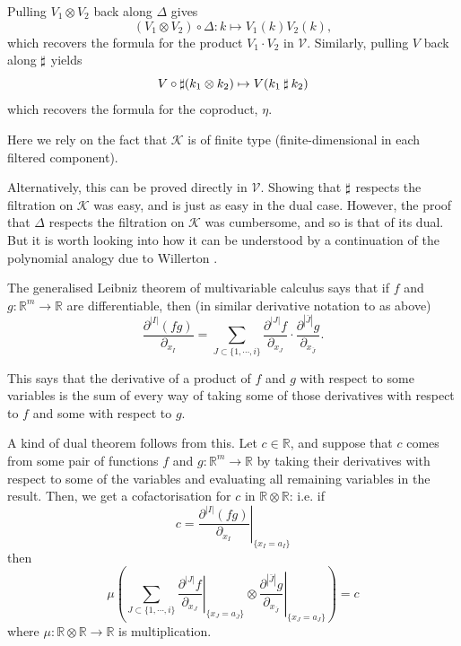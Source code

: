 Pulling \(V_{1} \otimes V_{2}\) back along \(\Delta\) gives
\[(V_{1} \otimes V_{2}) \circ \Delta: k \mapsto V_{1}(k)V_{2}(k),\]
which recovers the formula for the product \(V_{1} \cdot V_{2}\) in \(\mathcal{V}\). Similarly, pulling \(V\) back along \(\mathbin{\sharp}\) yields
\[V \circ \mathbin{\sharp} (k_{1} \otimes k_{2}) \mapsto V(k_{1} \mathbin{\sharp} k_{2})\]
which recovers the formula for the coproduct, \(\eta\).

Here we rely on the fact that \(\mathcal{K}\) is of finite type (finite-dimensional in each filtered component).

\begin{remark}
	Alternatively, this can be proved directly in \(\mathcal{V}\). Showing that \(\mathbin{\sharp}\) respects the filtration on \(\mathcal{K}\) was easy, and is just as easy in the dual case. However, the proof that \(\Delta\) respects the filtration on \(\mathcal{K}\) was cumbersome, and so is that of its dual. But it is worth looking into how it can be understood by a continuation of the polynomial analogy due to Willerton \cite{vassiliev-invariants-and-the-hopf-algebra-of-chord-diagrams}.

	The generalised Leibniz theorem of multivariable calculus says that if \(f\) and \(g: \mathbb{R}^{m} \to \mathbb{R}\) are differentiable, then (in similar derivative notation to as above)
	\[
		\frac{\partial^{|I|}(fg)}{\partial_{x_{I}}}
		=
		\sum_{J \subset \{1, \cdots, i\}}
		\frac{\partial^{|J|} f}{\partial_{x_{J}}}
		\cdot
		\frac{\partial^{|\bar{J}|} g}{\partial_{x_{\bar{J}}}}.
	\]

	This says that the derivative of a product of \(f\) and \(g\) with respect to some variables is the sum of every way of taking some of those derivatives with respect to \(f\) and some with respect to \(g\).

	A kind of dual theorem follows from this. Let \(c \in \mathbb{R}\), and suppose that \(c\) comes from some pair of functions \(f\) and \(g: \mathbb{R}^{m} \to \mathbb{R}\) by taking their derivatives with respect to some of the variables and evaluating all remaining variables in the result. Then, we get a cofactorisation for \(c\) in \(\mathbb{R} \otimes \mathbb{R}\): i.e. if
	\[c = \left. \frac{\partial^{|I|}(fg)}{\partial_{x_{I}}} \right|_{\{x_{I} = a_{I}\}}\]
	then
	\[
		\mu
		\left(
		\sum_{J \subset \{1, \cdots, i\}}
		\left. \frac{\partial^{|J|} f}{\partial_{x_{J}}} \right|_{\{x_{J} = a_{\bar{J}}\}}
		\otimes
		\left. \frac{\partial^{|\bar{J}|} g}{\partial_{x_{\bar{J}}}} \right|_{\{x_{J} = a_{J}\}}
		\right)
		=
		c
	\]
	where \(\mu: \mathbb{R} \otimes \mathbb{R} \to \mathbb{R}\) is multiplication.


\end{remark}
